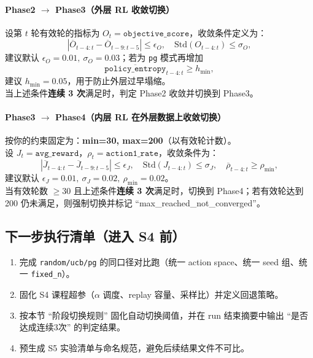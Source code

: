 \documentclass[UTF8,11pt,a4paper]{ctexart}
\begin{document}
\paragraph{Phase2 $\rightarrow$ Phase3（外层 RL 收敛切换）}
设第 $t$ 轮有效轮的指标为 $O_t=\texttt{objective\_score}$，收敛条件定义为：
\begin{equation}
\left|\overline{O}_{t-4:t}-\overline{O}_{t-9:t-5}\right|\le \epsilon_O,\quad
\mathrm{Std}(O_{t-4:t})\le \sigma_O,
\end{equation}
建议默认 $\epsilon_O=0.01,\ \sigma_O=0.03$；若为 \texttt{pg} 模式再增加
\begin{equation}
\overline{\texttt{policy\_entropy}}_{t-4:t}\ge h_{\min},
\end{equation}
建议 $h_{\min}=0.05$，用于防止外层过早塌缩。\\
当上述条件\textbf{连续 3 次}满足时，判定 Phase2 收敛并切换到 Phase3。

\paragraph{Phase3 $\rightarrow$ Phase4（内层 RL 在外层数据上收敛切换）}
按你的约束固定为：\textbf{min=30, max=200}（以有效轮计数）。\\
设 $J_t=\texttt{avg\_reward}$，$\rho_t=\texttt{action1\_rate}$，收敛条件为：
\begin{equation}
\left|\overline{J}_{t-4:t}-\overline{J}_{t-9:t-5}\right|\le \epsilon_J,\quad
\mathrm{Std}(J_{t-4:t})\le \sigma_J,\quad
\overline{\rho}_{t-4:t}\ge \rho_{\min},
\end{equation}
建议默认 $\epsilon_J=0.01,\ \sigma_J=0.02,\ \rho_{\min}=0.02$。\\
当有效轮数 $\ge 30$ 且上述条件\textbf{连续 3 次}满足时，切换到 Phase4；若有效轮达到 200 仍未满足，则强制切换并标记 ``max\_reached\_not\_converged''。

\subsection{下一步执行清单（进入 S4 前）}
\begin{enumerate}
\item 完成 \texttt{random/ucb/pg} 的同口径对比跑（统一 action space、统一 seed 组、统一 \texttt{fixed\_n}）。
\item 固化 S4 课程超参（$\alpha$ 调度、replay 容量、采样比）并定义回退策略。
\item 按本节 ``阶段切换规则'' 固化自动切换阈值，并在 run 结束摘要中输出 ``是否达成连续3次'' 的判定结果。
\item 预生成 S5 实验清单与命名规范，避免后续结果文件不可比。
\end{enumerate}
\end{document}

